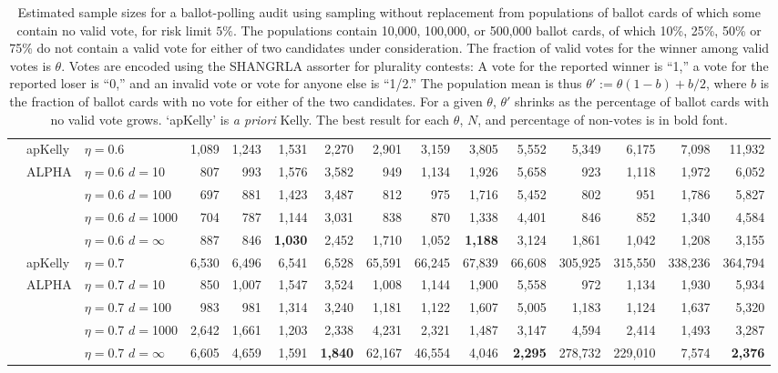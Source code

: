 \documentclass[aoas]{imsart}
\begin{document}
\begin{table}
\begin{tabular}{lll|rrrr|rrrr|rrrr}
\cline{2-15} & apKelly & $\eta=$0.6 & 1,089  & 1,243  & 1,531  & 2,270  & 2,901  & 3,159  & 3,805  & 5,552  & 5,349  & 6,175  & 7,098  & 11,932  \\
\cline{2-15}
& ALPHA & $\eta=$0.6 $d=$10 & 807  & 993  & 1,576  & 3,582  & 949  & 1,134  & 1,926  & 5,658  & 923  & 1,118  & 1,972  & 6,052  \\
&  & $\eta=$0.6 $d=$100 & 697  & 881  & 1,423  & 3,487  & 812  & 975  & 1,716  & 5,452  & 802  & 951  & 1,786  & 5,827  \\
&  & $\eta=$0.6 $d=$1000 & 704  & 787  & 1,144  & 3,031  & 838  & 870  & 1,338  & 4,401  & 846  & 852  & 1,340  & 4,584  \\
 &  & $\eta=$0.6 $d=\infty$ & 887  & 846  & \bf{1,030}  & 2,452  & 1,710  & 1,052  & \bf{1,188}  & 3,124  & 1,861  & 1,042  & 1,208  & 3,155  \\
\cline{2-15} & apKelly & $\eta=$0.7 & 6,530  & 6,496  & 6,541  & 6,528  & 65,591  & 66,245  & 67,839  & 66,608  & 305,925  & 315,550  & 338,236  & 364,794  \\
\cline{2-15}
& ALPHA & $\eta=$0.7 $d=$10 & 850  & 1,007  & 1,547  & 3,524  & 1,008  & 1,144  & 1,900  & 5,558  & 972  & 1,134  & 1,930  & 5,934  \\
&  & $\eta=$0.7 $d=$100 & 983  & 981  & 1,314  & 3,240  & 1,181  & 1,122  & 1,607  & 5,005  & 1,183  & 1,124  & 1,637  & 5,320  \\
&  & $\eta=$0.7 $d=$1000 & 2,642  & 1,661  & 1,203  & 2,338  & 4,231  & 2,321  & 1,487  & 3,147  & 4,594  & 2,414  & 1,493  & 3,287  \\
 &  & $\eta=$0.7 $d=\infty$ & 6,605  & 4,659  & 1,591  & \bf{1,840}  & 62,167  & 46,554  & 4,046  & \bf{2,295}  & 278,732  & 229,010  & 7,574  & \bf{2,376} 
\end{tabular} 
\caption{\protect \label{tab:without-replacement-blanks-1}
Estimated sample sizes for a ballot-polling audit using sampling without replacement from populations of ballot cards of which
some contain no valid vote, for risk limit $5\%$.
The populations contain 10,000, 100,000, or 500,000 ballot cards, of which 10\%, 25\%, 50\% or 75\% do not
contain a valid vote for either of two candidates under consideration.
The fraction of valid votes for the winner among valid votes is $\theta$. 
Votes are encoded using the SHANGRLA assorter for plurality contests:
A vote for the reported winner is ``1,'' a vote for the reported loser is ``0,'' and an invalid vote or vote for anyone else is ``1/2.''
The population mean is thus $\theta' := \theta(1-b) + b/2$, where $b$ is the fraction of ballot cards with no
vote for either of the two candidates.
For a given $\theta$, $\theta'$ shrinks as the percentage of ballot cards with no valid vote grows.
`apKelly' is \emph{a priori} Kelly.
The best result for each $\theta$, $N$, and percentage of non-votes is in bold font.
}
\end{table}
\end{document}
